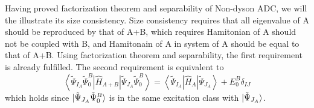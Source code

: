 Having proved factorization theorem and separability of Non-dyson ADC, we will the illustrate its size consistency.
Size consistency requires that all eigenvalue of A should be reproduced by that of A+B, which requires Hamitonian of A should not be coupled with B, and Hamitonain of A in system of A should be equal to that of A+B.
Using factorization theorem and separability, the first requirement is already fulfilled.
The second requirement is equivalent to
%
\begin{equation}
	\left\langle \tilde{\Psi}_{I_A} \tilde{\Psi}_0^B \left| \hat{H}_{A+B}\right| \tilde{\Psi}_{J_A} \tilde{\Psi}_0^B \right\rangle
	= \left\langle \tilde{\Psi}_{I_A} \left| \hat{H}_A \right| \tilde{\Psi}_{J_A} \right\rangle
	+ E_0^B \delta_{IJ}
\end{equation}
which holds since $\ket{\tilde{\Psi}_{J_A} \tilde{\Psi}_0^B}$ is in the same excitation class with $\ket{\tilde{\Psi}_{J_A}}$. 

